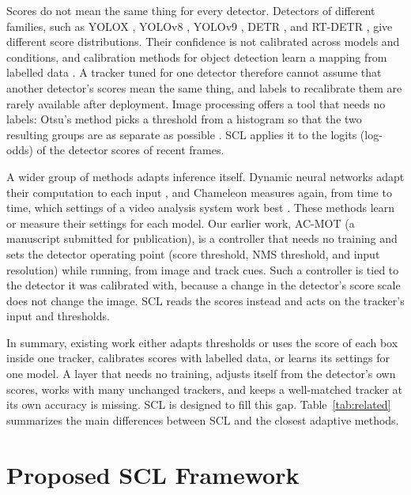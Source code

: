 \documentclass[pdflatex,sn-mathphys-num,iicol]{sn-jnl}
\newcommand{\scl}{SCL}
\begin{document}
Scores do not mean the same thing for every detector. Detectors of different families, such as
YOLOX \cite{ge2021yolox}, YOLOv8 \cite{jocher2023yolov8}, YOLOv9 \cite{wang2024yolov9}, DETR
\cite{carion2020detr}, and RT-DETR \cite{zhao2024rtdetr}, give different score distributions. Their
confidence is not calibrated across models and conditions, and calibration methods for object
detection learn a mapping from labelled data \cite{kuppers2020detcalib}. A tracker tuned for one
detector therefore cannot assume that another detector's scores mean the same thing, and labels to
recalibrate them are rarely available after deployment. Image processing offers a tool that needs
no labels: Otsu's method picks a threshold from a histogram so that the two resulting groups are as
separate as possible \cite{otsu1979}. \scl{} applies it to the logits (log-odds) of the detector
scores of recent frames.

A wider group of methods adapts inference itself. Dynamic neural networks adapt their computation
to each input \cite{han2022dynamic}, and Chameleon measures again, from time to time, which settings
of a video analysis system work best \cite{jiang2018chameleon}. These methods learn or measure their
settings for each model. Our earlier work, AC-MOT (a manuscript submitted for publication), is a
controller that needs no training and sets the detector operating point (score threshold, NMS
threshold, and input resolution) while running, from image and track cues. Such a controller is
tied to the detector it was calibrated with, because a change in the detector's score scale does
not change the image. \scl{} reads the scores instead and acts on the tracker's input and
thresholds.

In summary, existing work either adapts thresholds or uses the score of each box inside one
tracker, calibrates scores with labelled data, or learns its settings for one model. A layer that
needs no training, adjusts itself from the detector's own scores, works with many unchanged
trackers, and keeps a well-matched tracker at its own accuracy is missing. \scl{} is designed to
fill this gap. Table~\ref{tab:related} summarizes the main differences between \scl{} and the
closest adaptive methods.
\section{Proposed SCL Framework}\label{sec:method}
\end{document}
